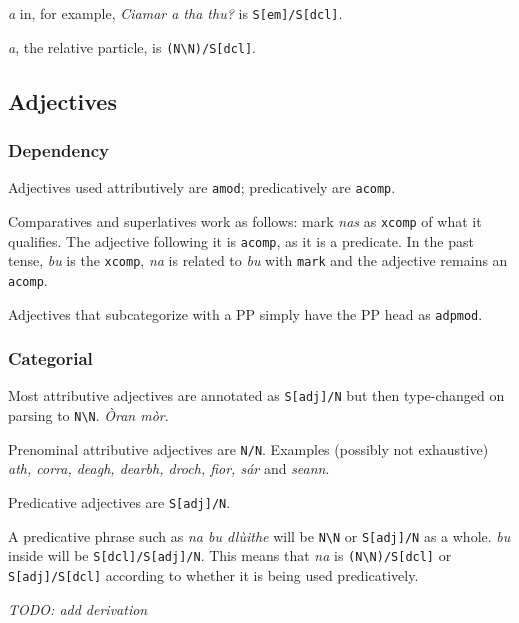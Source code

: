\documentclass[a4paper]{article}
\begin{document}
 \textit{a} in, for example, \textit{Ciamar a tha thu?} is \texttt{S[em]/S[dcl]}.

 \textit{a}, the relative particle, is \texttt{(N\textbackslash N)/S[dcl]}.

\subsection{Adjectives}

\subsubsection{Dependency}

 Adjectives used attributively are \texttt{amod}; predicatively are \texttt{acomp}.

 Comparatives and superlatives work as follows: mark \textit{nas} as \texttt{xcomp} of what it qualifies. The adjective following it is \texttt{acomp}, as it is a predicate. In the past tense, \textit{bu} is the \texttt{xcomp}, \textit{na} is related to \textit{bu} with \texttt{mark} and the adjective remains an \texttt{acomp}.

 Adjectives that subcategorize with a PP simply have the PP head as \texttt{adpmod}.

\subsubsection{Categorial}

 Most attributive adjectives are annotated as \texttt{S[adj]/N} but then type-changed on parsing to \texttt{N\textbackslash N}. \textit{\`Oran m\`or}.

 Prenominal attributive adjectives are \texttt{N/N}. Examples (possibly not exhaustive) \textit{ath, corra, deagh, dearbh, droch, fior, s\'ar} and \textit{seann}.

 Predicative adjectives are \texttt{S[adj]/N}.

 A predicative phrase such as \textit{na bu dl\`uithe} will be \texttt{N\textbackslash N} or \texttt{S[adj]/N} as a whole. \textit{bu} inside will be \texttt{S[dcl]/S[adj]/N}. This means that \textit{na} is \texttt{(N\textbackslash N)/S[dcl]} or \texttt{S[adj]/S[dcl]} according to whether it is being used predicatively.

\textit{TODO: add derivation}
\end{document}
